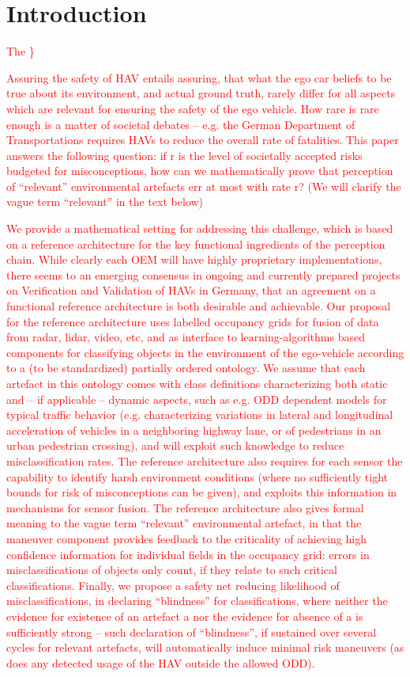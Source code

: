 \section{Introduction}
\textcolor{red}{The \}

Assuring the safety of HAV entails assuring, that what the ego car beliefs to be true about its environment, and actual ground truth, rarely differ for all aspects which are relevant for ensuring the safety of the ego vehicle. How rare is rare enough is a matter of societal debates -- e.g. the German Department of Transportations requires HAVs to reduce the overall rate of fatalities. This paper answers the following question: if  r  is the level of societally accepted risks budgeted for misconceptions, how can we mathematically prove that perception of \enquote{relevant} environmental artefacts err at most with rate r? (We will clarify the vague term \enquote{relevant} in the text below)

We provide a mathematical setting for addressing this challenge, which is based on a reference architecture for the key functional ingredients of the perception chain. While clearly each OEM will have highly proprietary implementations, there seems to an emerging consensus in ongoing and currently prepared projects on Verification and Validation of HAVs in Germany, that an agreement on a functional reference architecture is both desirable and achievable. Our proposal for the reference architecture uses labelled occupancy grids for fusion of data from radar, lidar, video, etc, and as interface to learning-algorithms based components for classifying objects in the environment of the ego-vehicle according to a (to be standardized) partially ordered ontology. We assume that each artefact in this ontology comes with class definitions characterizing both static and – if applicable – dynamic aspects, such as e.g. ODD dependent models for typical traffic behavior (e.g. characterizing variations in lateral and longitudinal acceleration of vehicles in a neighboring highway lane, or of pedestrians in an urban pedestrian crossing), and will exploit such knowledge to reduce misclassification rates. The reference architecture also requires for each sensor the capability to identify harsh environment conditions (where no sufficiently tight bounds for risk of misconceptions can be given), and exploits this information in mechanisms for sensor fusion. The reference architecture also gives formal meaning to the vague term \enquote{relevant} environmental artefact, in that the maneuver component provides feedback to the criticality of achieving high confidence information for individual fields in the occupancy grid: errors in misclassifications of objects only count, if they relate to such critical classifications. Finally, we propose a safety net reducing likelihood of misclassifications, in declaring \enquote{blindness} for classifications, where neither the evidence for existence of an artefact a nor the evidence for absence of a is sufficiently strong – such declaration of \enquote{blindness}, if sustained over several cycles for relevant artefacts, will automatically induce minimal risk maneuvers (as does any detected usage of the HAV outside the allowed ODD).

}
